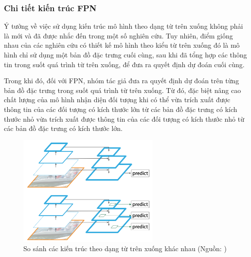{    \subsubsection*{Chi tiết kiến trúc FPN}
    Ý tưởng về việc sử dụng kiến trúc mô hình theo dạng từ trên xuống không phải là mới và đã được nhắc đến trong một số nghiên cứu. Tuy nhiên, điểm giống nhau của các nghiên cứu có thiết kế mô hình theo kiểu từ trên xuống đó là mô hình chỉ sử dụng một bản đồ đặc trưng cuối cùng, sau khi đã tổng hợp các thông tin trong suốt quá trình từ trên xuống, để đưa ra quyết định dự đoán cuối cùng.

    \noindent
    Trong khi đó, đối với FPN, nhóm tác giả đưa ra quyết định dự đoán trên từng bản đồ đặc trưng trong suốt quá trình từ trên xuống. Từ đó, đặc biệt nâng cao chất lượng của mô hình nhận diện đối tượng khi có thể vừa trích xuất được thông tin của các đối tượng có kích thước lớn từ các bản đồ đặc trưng có kích thước nhỏ vừa trích xuất được thông tin của các đối tượng có kích thước nhỏ từ các bản đồ đặc trưng có kích thước lớn.

    \begin{figure}[H]
        \centering
        \includegraphics[width=7cm] {images/fpn_topdown}
        \caption{So sánh các kiến trúc theo dạng từ trên xuống khác nhau (Nguồn: \cite{lin2017feature})}
        \label{fig:fpn_topdown}
    \end{figure}

}
